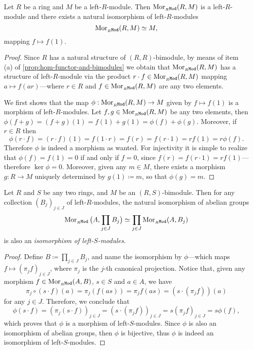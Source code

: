 \begin{corollary}
    \label{cor:Mor(R-M)-iso-M}
    Let \(R\) be a ring and \(M\) be a left-\(R\)-module. Then
    \(\operatorname{Mor}_{{{}_{R}\texttt{Mod}}}(R, M)\) is a left-\(R\)-module and there exists a natural
    isomorphism of left-\(R\)-modules
    \[
        \operatorname{Mor}_{{{}_{R}\texttt{Mod}}}(R, M) \simeq M,
    \]
    mapping \(f \mapsto f(1)\).
\end{corollary}

\begin{proof}
    Since \(R\) has a natural structure of \((R, R)\)-bimodule, by means of item (a)
    of \cref{prop:hom-functor-and-bimodules} we obtain that
    \(\operatorname{Mor}_{{{}_{R}\texttt{Mod}}}(R, M)\) has a structure of left-\(R\)-module via the product
    \(r \cdot f \in \operatorname{Mor}_{{{}_{R}\texttt{Mod}}}(R, M)\) mapping \(a \mapsto f(a r)\)---where
    \(r \in R\) and \(f \in \operatorname{Mor}_{{{}_{R}\texttt{Mod}}}(R, M)\) are any two elements.

    We first shows that the map \(\phi: \operatorname{Mor}_{{{}_{R}\texttt{Mod}}}(R, M) \to M\) given by
    \(f \mapsto f(1)\) is a morphism of left-\(R\)-modules. Let
    \(f, g \in \operatorname{Mor}_{{{}_{R}\texttt{Mod}}}(R, M)\) be any two elements, then
    \(\phi(f + g) = (f + g)(1) = f(1) + g(1) = \phi(f) + \phi(g)\). Moreover, if
    \(r \in R\) then
    \[
        \phi(r \cdot f) = (r \cdot f)(1) = f(1 \cdot r)
        = f(r) = f(r \cdot 1) = r f(1) = r \phi(f).
    \]
    Therefore \(\phi\) is indeed a morphism as wanted. For injectivity it is simple
    to realize that \(\phi(f) = f(1) = 0\) if and only if \(f = 0\), since
    \(f(r) = f(r \cdot 1) = r f(1)\)---therefore \(\ker \phi = 0\). Moreover, given
    any \(m \in M\), there exists a morphism \(g: R \to M\) uniquely determined by
    \(g(1) \coloneq m\), so that \(\phi(g) = m\).
\end{proof}

\begin{theorem}
    \label{thm:iso-prod-bimodules-morphism-set}
    Let \(R\) and \(S\) be any two rings, and \(M\) be an \((R, S)\)-bimodule. Then
    for any collection \((B_j)_{j \in J}\) of left-\(R\)-modules, the natural
    isomorphism of abelian groups
    \[
        \operatorname{Mor}_{{{}_{R}\texttt{Mod}}}\big(A, \prod_{j \in J} B_j\big)
        \simeq
        \prod_{j \in J} \operatorname{Mor}_{{{}_{R}\texttt{Mod}}}(A, B_j)
    \]
    is also an \emph{isomorphism of left-\(S\)-modules}.
\end{theorem}

\begin{proof}
    Define \(B \coloneq \prod_{j \in J} B_j\), and name the isomorphism by
    \(\phi\)---which maps \(f \mapsto (\pi_j f)_{j \in J}\), where \(\pi_j\) is the
    \(j\)-th canonical projection. Notice that, given any morphism \(f \in
    \operatorname{Mor}_{{{}_{R}\texttt{Mod}}}(A, B)\), \(s \in S\) and \(a \in A\), we have
    \[
        \pi_j \circ (s \cdot f)(a) = \pi_j(f(a s))
        = \pi_j f(a s) = (s \cdot (\pi_j f))(a)
    \]
    for any \(j \in J\). Therefore, we conclude that
    \[
        \phi(s \cdot f) = (\pi_j(s \cdot f))_{j \in J} = (s \cdot (\pi_j f))_{j \in J}
        = s (\pi_j f)_{j \in J} = s \phi(f),
    \]
    which proves that \(\phi\) is a morphism of left-\(S\)-modules. Since \(\phi\)
    is also an isomorphism of abelian groups, then \(\phi\) is bijective, thus
    \(\phi\) is indeed an isomorphism of left-\(S\)-modules.
\end{proof}

